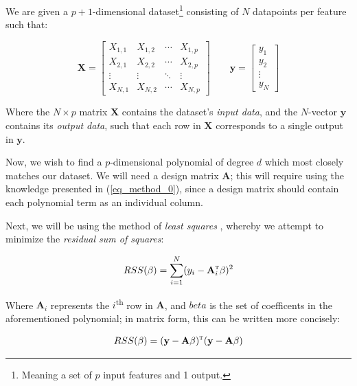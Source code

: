 \documentclass[a4paper,10pt,english]{article}
\begin{document}
	We are given a $p+1$-dimensional dataset\footnote{Meaning a set of $p$ input features and 1 output.} consisting of $N$ datapoints per feature such that:
	
	\begin{equation}
	\label{eq_method_1}
	\mathbf{X} = \begin{bmatrix} X_{1,1} & X_{1,2} & \cdots & X_{1,p} \\ X_{2,1} & X_{2,2} & \cdots & X_{2,p} \\ \vdots & \vdots & \ddots & \vdots \\ X_{N,1} & X_{N,2} & \cdots & X_{N,p} \end{bmatrix} \qquad \mathbf{y} = \begin{bmatrix} y_1 \\ y_2 \\ \vdots \\ y_N \end{bmatrix}
	\end{equation}
	
	Where the $N \times p$ matrix $\mathbf{X}$ contains the dataset's \textit{input data}, and the $N$-vector $\mathbf{y}$ contains its \textit{output data}, such that each row in $\mathbf{X}$ corresponds to a single output in $\mathbf{y}$.
	
	Now, we wish to find a $p$-dimensional polynomial of degree $d$ which most closely matches our dataset. We will need a design matrix $\mathbf{A}$; this will require using the knowledge presented in (\ref{eq_method_0}), since a design matrix should contain each polynomial term as an individual column.
	
	Next, we will be using the method of \textit{least squares} \cite{hastie_tibshirani_friedman_2013}, whereby we attempt to minimize the \textit{residual sum of squares}:
	
	\begin{equation*}
	RSS(\beta) = \sum_{i=1}^N (y_i - \mathbf{A}_i^\textsc{t} \beta)^2 
	\end{equation*}
	
	Where $\mathbf{A}_i$ represents the $i$\textsuperscript{th} row in $\mathbf{A}$, and $beta$ is the set of coefficents in the aforementioned polynomial; in matrix form, this can be written more concisely:
	
	\begin{equation*}
	RSS(\beta) = (\mathbf{y} - \mathbf{A} \beta)^\textsc{t}(\mathbf{y} - \mathbf{A} \beta)
	\end{equation*}
	
\end{document}

